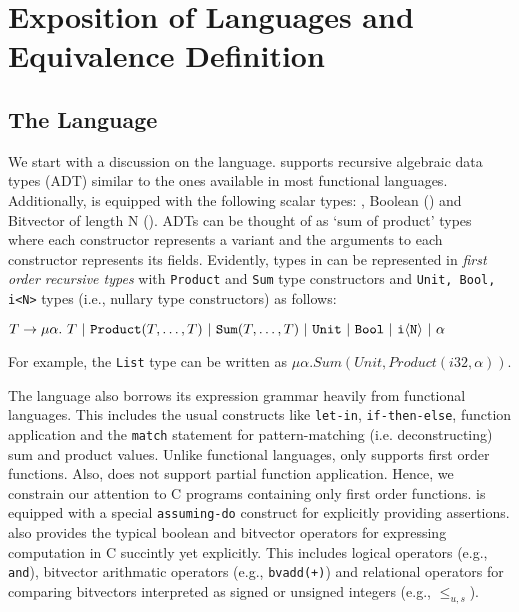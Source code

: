 \section{Exposition of Languages and Equivalence Definition}
\label{sec:lang-eqdef}

\subsection{The \SpecL{} Language}
\label{sec:speclang}
We start with a discussion on the \SpecL{} language.
\SpecL{} supports recursive algebraic data types (ADT) similar to the ones available in most functional languages.
Additionally, \SpecL{} is equipped with the following scalar types: , Boolean () and Bitvector of length N ().
ADTs can be thought of as `sum of product' types where each constructor represents a variant
and the arguments to each constructor represents its fields.
Evidently, types in \SpecL{} can be represented in {\em first order recursive types} with {\tt Product} and {\tt Sum} type constructors and {\tt Unit, Bool, i<N>} types (i.e., nullary type constructors) as follows:

$T \rightarrow {\tt \mu} \alpha.\ T \ |\  {\tt Product}(T,\dots,T) \ |\  {\tt Sum}(T,\dots,T) \ |\  {\tt Unit} \ |\ {\tt Bool} \ |\  {\tt i\langle N \rangle} \ |\  \alpha$

For example, the {\tt List} type can be written as $\mu \alpha. Sum(Unit, Product(i32,\alpha))$.

The language also borrows its expression grammar heavily from functional languages.
This includes the usual constructs like {\tt let-in}, {\tt if-then-else}, function application and the {\tt match} statement
for pattern-matching (i.e. deconstructing) sum and product values.
Unlike functional languages, \SpecL{} only supports first order functions.
Also, \SpecL{} does not support partial function application.
Hence, we constrain our attention to C programs containing only first order functions.
\SpecL{} is equipped with a special {\tt assuming-do} construct for explicitly providing assertions.
\SpecL{} also provides the typical boolean and bitvector operators for expressing computation in C succintly yet explicitly.
This includes logical operators (e.g., {\tt and}), bitvector arithmatic operators (e.g., {\tt bvadd(+)}) and
relational operators for comparing bitvectors interpreted as signed or unsigned integers (e.g., {\tt $\leq_{u,s}$}).



